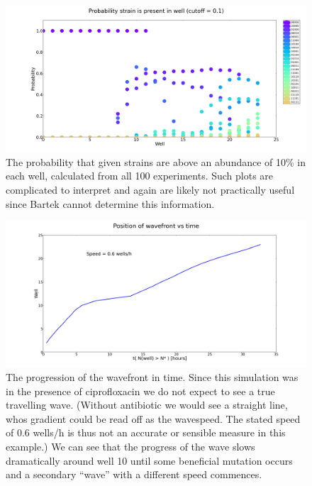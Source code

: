 \documentclass[a4paper,10pt]{article}
\begin{document}
 \begin{figure}
  \centering
  \includegraphics[width=0.95\linewidth]{strain_probabilities}
\caption{The probability that given strains are above an abundance of 10\% in each well, calculated from all 100 experiments.
Such plots are complicated to interpret and again are likely not practically useful since Bartek cannot determine this information.}
\label{fig:strainProbabilities}
\end{figure}
 
 
 
  \begin{figure}
  \centering
  \includegraphics[width=0.95\linewidth]{wavefront}
\caption{The progression of the wavefront in time. Since this simulation was in the presence of ciprofloxacin we do not expect to see a true travelling wave.
(Without antibiotic we would see a straight line, whos gradient could be read off as the wavespeed. The stated speed of 0.6 wells/h is thus not
an accurate or sensible measure in this example.)
We can see that the progress of the wave slows dramatically around well 10 until some beneficial mutation occurs and a secondary
``wave'' with a different speed commences.}
\label{fig:wavefront}
\end{figure}
 
 
 
\end{document}
